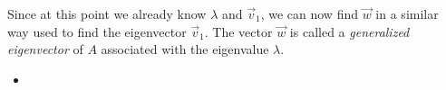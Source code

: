 Since at this point we already know $\lambda$ and $\vec{v}_1$, we can now find $\vec{w}$ in a similar way used to find the eigenvector $\vec{v}_1$. The vector $\vec{w}$ is called a \emph{generalized eigenvector} of $A$ associated with the eigenvalue $\lambda$.


\begin{video}
	\begin{itemize}
		\item {}
	\end{itemize}
\end{video}





